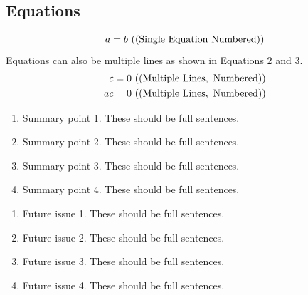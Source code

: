 \documentclass{ar-1col}
\begin{document}
\subsection{Equations}
\begin{equation}
  a = b \ {\rm ((Single\ Equation\ Numbered))}
\end{equation}
Equations can also be multiple lines as shown in Equations 2 and 3.
\begin{eqnarray}
  c = 0 \ {\rm ((Multiple\  Lines, \ Numbered))}\\
  ac = 0 \ {\rm ((Multiple \ Lines, \ Numbered))}
\end{eqnarray}

\begin{summary}
  \begin{enumerate}
  \item Summary point 1. These should be full sentences.
  \item Summary point 2. These should be full sentences.
  \item Summary point 3. These should be full sentences.
  \item Summary point 4. These should be full sentences.
  \end{enumerate}
\end{summary}

\begin{issues}
  \begin{enumerate}
  \item Future issue 1. These should be full sentences.
  \item Future issue 2. These should be full sentences.
  \item Future issue 3. These should be full sentences.
  \item Future issue 4. These should be full sentences.
  \end{enumerate}
\end{issues}

\newpage


 

\clearpage



    
\end{document}
